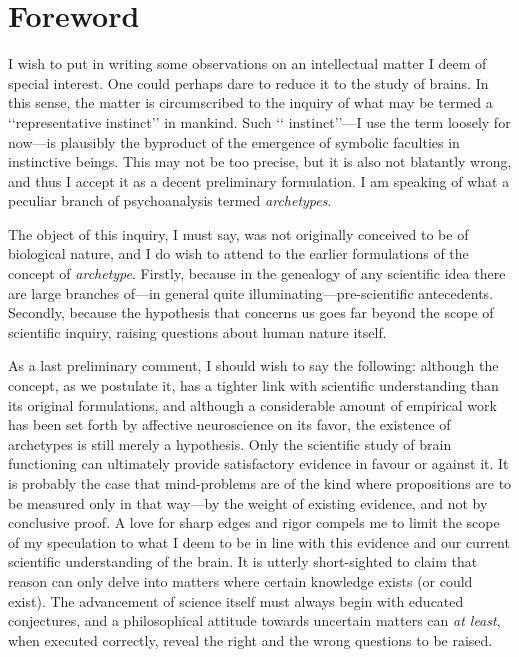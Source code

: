 \documentclass[a4paper]{article}
\begin{document}
\section{Foreword}

I wish to put in writing some observations on an intellectual matter I deem
of special interest. One could perhaps dare to reduce it to the study of
brains. In this sense, the matter is circumscribed to the inquiry of what may be
termed a \lq\lq representative instinct\rq\rq{} in mankind. Such \lq\lq
instinct\rq\rq{}---I use the term loosely for now---is plausibly the
byproduct of the emergence of symbolic faculties in instinctive beings.
This may not be too precise, but it is also not blatantly wrong, and thus I
accept it as a decent preliminary formulation. I am speaking of what a
peculiar branch of psychoanalysis termed \textit{archetypes}.

The object of this inquiry, I must say, was not originally conceived to be of
biological nature, and I do wish to attend to the earlier formulations of the
concept of \textit{archetype}. Firstly, because in the genealogy of any
scientific idea there are large branches of---in general quite
illuminating---pre-scientific antecedents. Secondly, because the hypothesis that
concerns us goes far beyond the scope of scientific inquiry, raising questions
about human nature itself.

As a last preliminary comment, I should wish to say the following: although the
concept, as we postulate it, has a tighter link with scientific understanding
than its original formulations, and although a considerable amount of empirical
work has been set forth by affective neuroscience on its favor, the existence
of archetypes is still merely a hypothesis. Only the scientific study of brain
functioning can ultimately provide satisfactory evidence in favour or against
it. It is probably the case that mind-problems are of the kind where
propositions are to be measured only in that way---by the weight of existing
evidence, and not by conclusive proof. A love for sharp edges and rigor compels
me to limit the scope of my speculation to what I deem to be in line with this
evidence and our current scientific understanding of the brain. It is utterly
short-sighted to claim that reason can only delve into matters where certain
knowledge exists (or could exist). The advancement of science itself must always
begin with educated conjectures, and a philosophical attitude towards uncertain
matters can \textit{at least}, when executed correctly, reveal the right and the
wrong questions to be raised.
\end{document}
